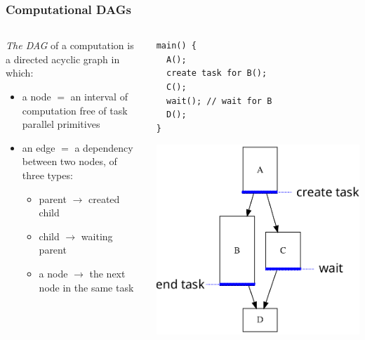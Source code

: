 \documentclass[12pt,dvipdfmx]{beamer}
\newcommand{\ao}[1]{{\color{blue}#1}}
\begin{document}
\begin{frame}[fragile]
\frametitle{Computational DAGs}
\begin{columns}[t]
\begin{column}{0.65\textwidth}
\ao{\em The DAG} of a computation is a directed acyclic graph in which:
\begin{itemize}
\item a node $=$ an interval of computation 
free of task parallel primitives

\item an edge $=$ a dependency between two nodes, of three types:
  \begin{itemize}
  \item parent $\rightarrow$ created child
  \item child $\rightarrow$ waiting parent
  \item a node $\rightarrow$ the next node in the same task
  \end{itemize}
\end{itemize}
\end{column}

\begin{column}{0.30\textwidth}
\begin{lstlisting}
main() {
  A();
  create task for B();
  C();
  wait(); // wait for B
  D();
}    
\end{lstlisting}

\begin{center}
\includegraphics[width=\textwidth]{out/pdf/svg/dag.pdf}
\end{center}
\end{column}
\end{columns}
\end{frame}
\end{document}
